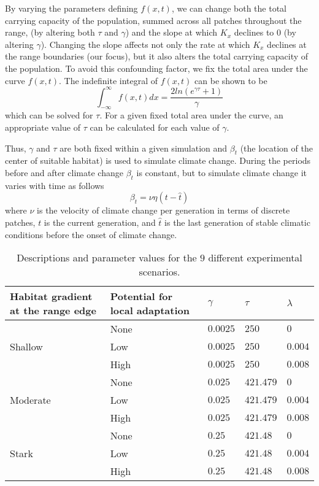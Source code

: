 \documentclass[12pt, oneside]{article}
\begin{document}
By varying the parameters defining $f(x,t)$, we can change both the total carrying capacity of the population, summed across all patches throughout the range, (by altering both $\tau$ and $\gamma$) and the slope at which $K_{x}$ declines to $0$ (by altering $\gamma$). Changing the slope affects not only the rate at which $K_{x}$ declines at the range boundaries (our focus), but it also alters the total carrying capacity of the population. To avoid this confounding factor, we fix the total area under the curve $f(x,t)$. The indefinite integral of $f(x,t)$ can be shown to be
\begin{equation}
\int_{-\infty}^{\infty}f(x,t)dx = \frac{2ln(e^{\gamma\tau}+1)}{\gamma}
\end{equation}
which can be solved for $\tau$. For a given fixed total area under the curve, an appropriate value of $\tau$ can be calculated for each value of $\gamma$.

Thus, $\gamma$ and $\tau$ are both fixed within a given simulation and $\beta_{t}$ (the location of the center of suitable habitat) is used to simulate climate change. During the periods before and after climate change $\beta_{t}$ is constant, but to simulate climate change it varies with time as follows
\begin{equation}
\beta_{t}=\nu\eta(t-\hat{t})
\end{equation}
where $\nu$ is the velocity of climate change per generation in terms of discrete patches, $t$ is the current generation, and $\hat{t}$ is the last generation of stable climatic conditions before the onset of climate change.

\begin{table}
\renewcommand{\arraystretch}{1.5}
  \begin{tabular}{ p{4cm} | p{4cm} | p{1.5cm} | p{1.5cm} | p{1.5cm} }
    \hline
    Habitat gradient at the range edge & Potential for local adaptation & $\gamma$ & $\tau$ & $\lambda$  \\ \hline \hline
     & None & $0.0025$ & $250$ & $0$ \\
    Shallow & Low & $0.0025$ & $250$ & $0.004$ \\
     & High & $0.0025$ & $250$ & $0.008$ \\ \hline
     & None & $0.025$ & $421.479$ & $0$ \\
    Moderate & Low & $0.025$ & $421.479$ & $0.004$ \\
     & High & $0.025$ & $421.479$ & $0.008$ \\ \hline
     & None & $0.25$ & $421.48$ & $0$ \\
    Stark & Low & $0.25$ & $421.48$ & $0.004$ \\
     & High & $0.25$ & $421.48$ & $0.008$ \\ 
    \hline
  \end{tabular}
\caption[LoF entry]{Descriptions and parameter values for the $9$ different experimental scenarios.}
\label{table:Scenarios}
\end{table}
\end{document}
